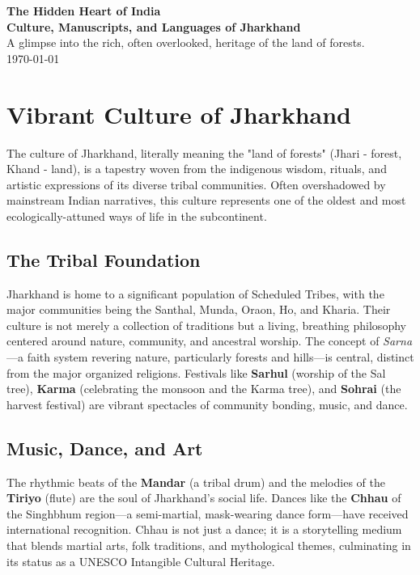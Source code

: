 \documentclass{article}
\begin{document}
\begin{titlepage}
    \centering
    \vspace*{2cm}
    {\Huge\bfseries\color{jharkhandgreen} The Hidden Heart of India}\\[0.5cm]
    {\LARGE\bfseries\color{jharkhandred} Culture, Manuscripts, and Languages of Jharkhand}\\[1.5cm]
    {\large A glimpse into the rich, often overlooked, heritage of the land of forests.}\\[2.5cm]

    \vfill
    {\large \today}
\end{titlepage}

\tableofcontents
\newpage

\section{Vibrant Culture of Jharkhand}
The culture of Jharkhand, literally meaning the "land of forests" (Jhari - forest, Khand - land), is a tapestry woven from the indigenous wisdom, rituals, and artistic expressions of its diverse tribal communities. Often overshadowed by mainstream Indian narratives, this culture represents one of the oldest and most ecologically-attuned ways of life in the subcontinent.

\subsection{The Tribal Foundation}
Jharkhand is home to a significant population of Scheduled Tribes, with the major communities being the Santhal, Munda, Oraon, Ho, and Kharia. Their culture is not merely a collection of traditions but a living, breathing philosophy centered around nature, community, and ancestral worship. The concept of \textit{Sarna}—a faith system revering nature, particularly forests and hills—is central, distinct from the major organized religions. Festivals like \textbf{Sarhul} (worship of the Sal tree), \textbf{Karma} (celebrating the monsoon and the Karma tree), and \textbf{Sohrai} (the harvest festival) are vibrant spectacles of community bonding, music, and dance.

\subsection{Music, Dance, and Art}
The rhythmic beats of the \textbf{Mandar} (a tribal drum) and the melodies of the \textbf{Tiriyo} (flute) are the soul of Jharkhand's social life. Dances like the \textbf{Chhau} of the Singhbhum region—a semi-martial, mask-wearing dance form—have received international recognition. Chhau is not just a dance; it is a storytelling medium that blends martial arts, folk traditions, and mythological themes, culminating in its status as a UNESCO Intangible Cultural Heritage.
\end{document}
